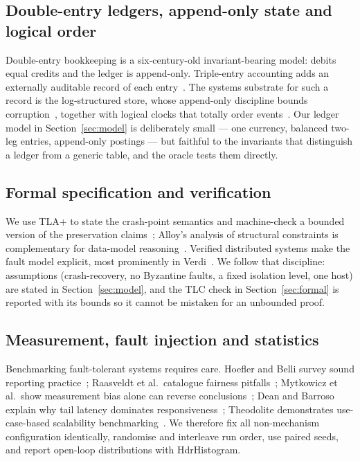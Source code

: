 \subsection{Double-entry ledgers, append-only state and logical order}
\label{sec:rel-ledger}

Double-entry bookkeeping is a six-century-old invariant-bearing model: debits equal
credits and the ledger is append-only. Triple-entry accounting adds an externally
auditable record of each entry~\cite{triple2019,triple2021}. The systems substrate for
such a record is the log-structured store, whose append-only discipline bounds
corruption~\cite{lsfs1992}, together with logical clocks that totally order
events~\cite{lamport1978}. Our ledger model in Section~\ref{sec:model} is deliberately
small --- one currency, balanced two-leg entries, append-only postings --- but faithful to
the invariants that distinguish a ledger from a generic table, and the oracle tests them
directly.

\subsection{Formal specification and verification}
\label{sec:rel-formal}

We use TLA+ to state the crash-point semantics and machine-check a bounded version of the
preservation claims~\cite{lamport1994}; Alloy's analysis of structural constraints is
complementary for data-model reasoning~\cite{jackson2002}. Verified distributed systems
make the fault model explicit, most prominently in Verdi~\cite{verdi2015}. We follow that
discipline: assumptions (crash-recovery, no Byzantine faults, a fixed isolation level, one
host) are stated in Section~\ref{sec:model}, and the TLC check in
Section~\ref{sec:formal} is reported with its bounds so it cannot be mistaken for an
unbounded proof.

\subsection{Measurement, fault injection and statistics}
\label{sec:rel-method}

Benchmarking fault-tolerant systems requires care. Hoefler and Belli survey sound reporting
practice~\cite{hoefler2015}; Raasveldt et al.\ catalogue fairness pitfalls~\cite{raasveldt2018};
Mytkowicz et al.\ show measurement bias alone can reverse conclusions~\cite{mytkowicz2009};
Dean and Barroso explain why tail latency dominates responsiveness~\cite{dean2013}; Theodolite
demonstrates use-case-based scalability benchmarking~\cite{theodolite2021}. We therefore fix all
non-mechanism configuration identically, randomise and interleave run order, use paired seeds,
and report open-loop distributions with HdrHistogram.

